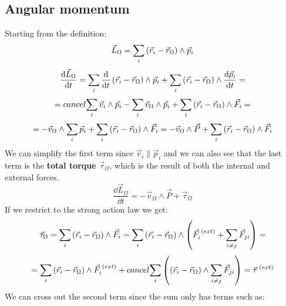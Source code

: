\subsection{Angular momentum}
Starting from the definition:
\begin{equation}
    \vec{L}_{\Omega} = \displaystyle\sum_{i}\left(\vec{r}_i-\vec{r}_{\Omega}\right)\wedge\vec{p}_i
\end{equation}
\begin{equation}
    \dfrac{\dd{\vec{L}_{\Omega}}}{\dd{t}} = \displaystyle\sum_{i}\dfrac{\dd{}}{\dd{t}}\left(\vec{r}_i-\vec{r}_{\Omega}\right)\wedge\vec{p}_i + \displaystyle\sum_{i}\left(\vec{r}_i-\vec{r}_{\Omega}\right)\wedge\dfrac{\dd{\vec{p}_i}}{\dd{t}} =
\end{equation}
\begin{equation}
    = \\cancel{\displaystyle\sum_{i}\vec{v}_i\wedge\vec{p}_i}-\displaystyle\sum_{i}\vec{v}_{\Omega}\wedge\vec{p}_i + \displaystyle\sum_{i}\left(\vec{r}_i-\vec{r}_{\Omega}\right)\wedge\vec{F}_i =
\end{equation}
\begin{equation}
    = -\vec{v}_{\Omega}\wedge\displaystyle\sum_{i}\vec{p}_i + \displaystyle\sum_{i}\left(\vec{r}_i-\vec{r}_{\Omega}\right)\wedge\vec{F}_i = -\vec{v}_{\Omega}\wedge\vec{P} + \displaystyle\sum_{i}\left(\vec{r}_i-\vec{r}_{\Omega}\right)\wedge\vec{F}_i
\end{equation}
We can simplify the first term since $\vec{v}_i \parallel \vec{p}_i$ and we can also see that the last term is the \textbf{total torque} $\vec{\tau}_{\Omega}$, which is the result of both the internal and external forces.
\begin{equation} \label{e:first_angular_expression}
    \dfrac{\dd{\vec{L}_{\Omega}}}{\dd{t}} = -\vec{v}_{\Omega}\wedge\vec{P} + \vec{\tau}_{\Omega}
\end{equation}
If we restrict to the strong action law we get:
\begin{equation}
    \vec{\tau}_{\Omega} = \displaystyle\sum_{i}\left(\vec{r}_i-\vec{r}_{\Omega}\right)\wedge\vec{F}_i = \displaystyle\sum_{i}\left(\vec{r}_i-\vec{r}_{\Omega}\right)\wedge\left(\vec{F}_i^{\;(ext)}+ \displaystyle\sum_{i\neq j}\vec{F}_{ji}\right) =
\end{equation}
\begin{equation}
    = \displaystyle\sum_{i}\left(\vec{r}_i-\vec{r}_{\Omega}\right)\wedge\vec{F}_i^{\;(ext)} + \\cancel{\displaystyle\sum_{i}\left(\left(\vec{r}_i-\vec{r}_{\Omega}\right)\wedge\displaystyle\sum_{i\neq j}\vec{F}_{ji}\right)} = \vec{\tau}^{\;(ext)}
\end{equation}
We can cross out the second term since the sum only has terms such as:
